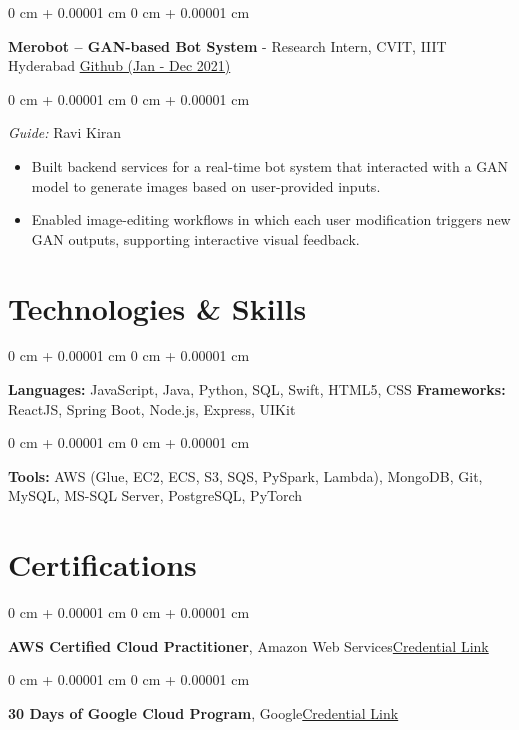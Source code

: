 \documentclass[10pt, a4paper]{article}
\newenvironment{highlights}{
    \begin{itemize}[
        topsep=0.10 cm,
        parsep=0.10 cm,
        partopsep=0pt,
        itemsep=0pt,
        leftmargin=0 cm + 10pt
    ]
}{
    \end{itemize}
} %
\newenvironment{onecolentry}{
    \begin{adjustwidth}{
        0 cm + 0.00001 cm
    }{
        0 cm + 0.00001 cm
    }
}{
    \end{adjustwidth}
} %
\newenvironment{twocolentry}[2][]{
    \onecolentry
    \def\secondColumn{#2}
    \setcolumnwidth{\fill, 6.0 cm}
    \begin{paracol}{2}
}{
    \switchcolumn \raggedleft \secondColumn
    \end{paracol}
    \endonecolentry
} %
\begin{document}
        \begin{twocolentry}{
            \href{https://github.com/ammrit2312/Merobot/tree/master}{Github (Jan - Dec 2021)}
        }
            \textbf{Merobot – GAN-based Bot System} - Research Intern, CVIT, IIIT Hyderabad\end{twocolentry}

        \vspace{0.10 cm}
        \begin{onecolentry}
            \textit{Guide:} Ravi Kiran\\
            \begin{highlights}
                \item Built backend services for a real-time bot system that interacted with a GAN model to generate images based on user-provided inputs.
                \item Enabled image-editing workflows in which each user modification triggers new GAN outputs, supporting interactive visual feedback.
            \end{highlights}
        \end{onecolentry}
    
    \section{Technologies \& Skills}
        \begin{onecolentry}
            \textbf{Languages:} JavaScript, Java, Python, SQL, Swift, HTML5, CSS \quad \textbf{Frameworks:} ReactJS, Spring Boot, Node.js, Express, UIKit
        \end{onecolentry}
        \begin{onecolentry}
            \textbf{Tools:} AWS (Glue, EC2, ECS, S3, SQS, PySpark, Lambda), MongoDB, Git, MySQL, MS-SQL Server, PostgreSQL, PyTorch
        \end{onecolentry}

    \section{Certifications}

    \begin{onecolentry}
        \textbf{AWS Certified Cloud Practitioner}, Amazon Web Services\hfill \href{https://cp.certmetrics.com/amazon/en/public/verify/credential/21NY0Y6C714E1JSB}{Credential Link}
    \end{onecolentry}
    
    \begin{onecolentry}
        \textbf{30 Days of Google Cloud Program}, Google\hfill \href{https://drive.google.com/file/d/131IwLvWr8a6YWLYd5ILZ6kvacsKfmkWc/view}{Credential Link}
    \end{onecolentry}
    
\end{document}
